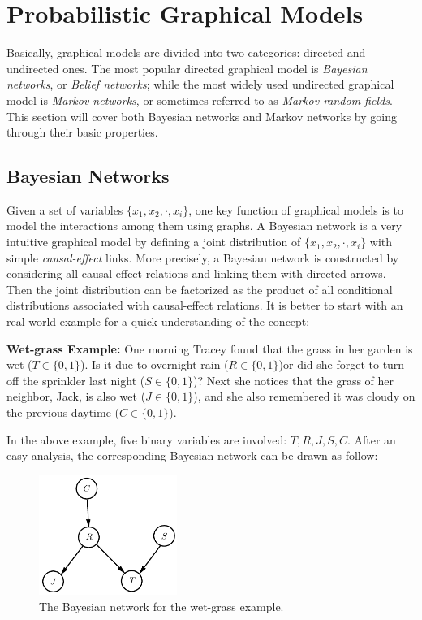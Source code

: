 \section{Probabilistic Graphical Models}
\label{sec:PGMs}
Basically, graphical models are divided into two categories: directed and undirected ones. The most popular directed graphical model is \emph{Bayesian networks}, or \emph{Belief networks}; 
while the most widely used undirected graphical model is \emph{Markov networks}, or sometimes referred to as \emph{Markov random fields}. This section will cover both Bayesian networks and 
Markov networks by going through their basic properties.   

\subsection{Bayesian Networks}
Given a set of variables $\{x_1,x_2,\cdot, x_i\}$, one key function of graphical models is to model the interactions among them using graphs. A Bayesian network is a very 
intuitive graphical model by defining a joint distribution of  $\{x_1,x_2,\cdot, x_i\}$ with simple \emph{causal-effect} links. More precisely,  a Bayesian network is constructed by considering 
all causal-effect relations and linking them with directed arrows. Then the joint distribution can be factorized as the product of all conditional distributions associated with causal-effect relations. 
It is better to start with an real-world example \citep{Barber_book} for a 
quick understanding of the concept:   
\begin{shaded}
   \textbf{Wet-grass Example:} One morning Tracey found that the grass in her garden is wet ($T\in\{0,1\}$). Is it due to overnight rain ($R \in\{0,1\}$)or did
she forget to turn off the sprinkler last night ($S\in\{0,1\}$)? Next she notices that the grass of her neighbor, Jack, is also
wet ($J\in\{0,1\}$), and she also remembered it was cloudy on the previous daytime ($C\in\{0,1\}$).                   
\end{shaded}
In the above example, five binary variables are involved: $T,R,J,S,C$. After an easy analysis, the corresponding Bayesian network can be drawn as follow: 
\begin{figure}[h]
   \centering
   \includegraphics[width=0.4\textwidth]{./Figures/wet_glass_BN.pdf}
   \caption{The Bayesian network for the wet-grass example.}
\end{figure}

